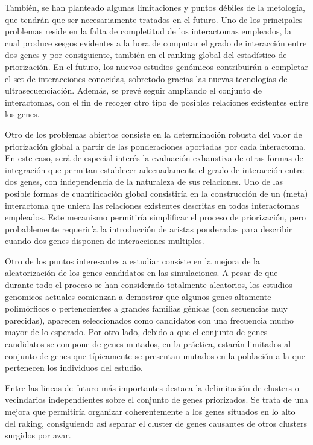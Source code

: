 \medskip
También, se han planteado algunas limitaciones y puntos débiles de la metología, que tendrán que ser necesariamente tratados en el futuro. Uno de los principales problemas reside en la falta de completitud de los interactomas empleados, la cual produce sesgos evidentes a la hora de computar el grado de interacción entre dos genes y por consiguiente, también en el ranking global del estadístico de priorización. En el futuro, los nuevos estudios genómicos contribuirán a completar el set de interacciones conocidas, sobretodo gracias las nuevas tecnologías de ultrasecuenciación. Además, se prevé seguir ampliando el conjunto de interactomas, con el fin de recoger otro tipo de posibles relaciones existentes entre los genes. 

\medskip
Otro de los problemas abiertos consiste en la determinación robusta del valor de priorización global a partir de las ponderaciones aportadas por cada interactoma. En este caso, será de especial interés la evaluación exhaustiva de otras formas de integración que permitan establecer adecuadamente el grado de interacción entre dos genes, con independencia de la naturaleza de sus relaciones. Uno de las posible formas de cuantificación global consistiría en la construcción de un (meta) interactoma que uniera las relaciones existentes descritas en todos interactomas empleados. Este mecanismo permitiría simplificar el proceso de priorización, pero probablemente requeriría la introducción de aristas ponderadas para describir cuando dos genes disponen de interacciones multiples.

\medskip
Otro de los puntos interesantes a estudiar consiste en la mejora de la aleatorización de los genes candidatos en las simulaciones. A pesar de que durante todo el proceso se han considerado totalmente aleatorios, los estudios genomicos actuales comienzan a demostrar que algunos genes altamente polimórficos o pertenecientes a grandes familias génicas (con secuencias muy parecidas), aparecen seleccionados como candidatos con una frecuencia mucho mayor de lo esperado. Por otro lado, debido a que el conjunto de genes candidatos se compone de genes mutados, en la práctica, estarán limitados al conjunto de genes que típicamente se presentan mutados en la población a la que pertenecen los individuos del estudio.

\medskip
Entre las lineas de futuro más importantes destaca la delimitación de clusters o vecindarios independientes sobre el conjunto de genes priorizados. Se trata de una mejora que permitiría organizar coherentemente a los genes situados en lo alto del raking, consiguiendo así separar el cluster de genes causantes de otros clusters surgidos por azar. 

